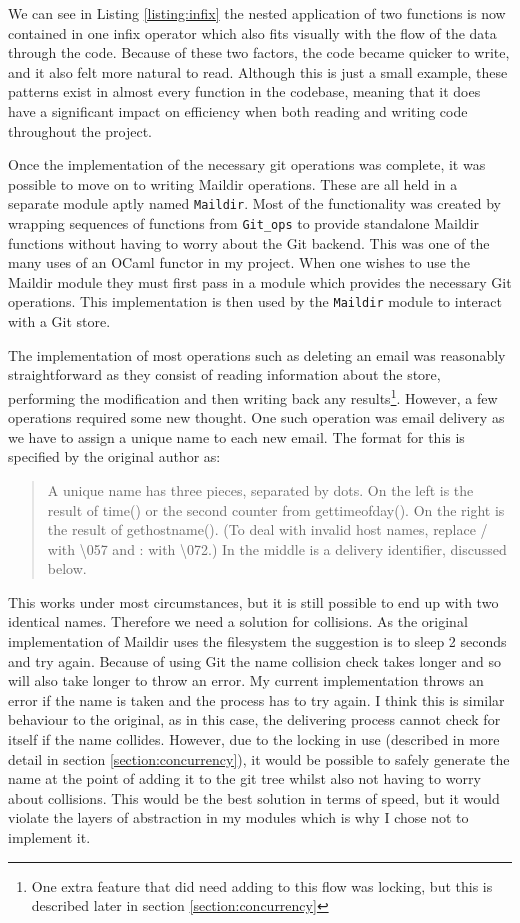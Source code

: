 We can see in Listing \ref{listing:infix} the nested application of two functions is now contained in one infix operator which also fits visually with the flow of the data through the code. Because of these two factors, the code became quicker to write, and it also felt more natural to read. Although this is just a small example, these patterns exist in almost every function in the codebase, meaning that it does have a significant impact on efficiency when both reading and writing code throughout the project.

Once the implementation of the necessary git operations was complete, it was possible to move on to writing Maildir operations. These are all held in a separate module aptly named \texttt{Maildir}. Most of the functionality was created by wrapping sequences of functions from \texttt{Git\_ops} to provide standalone Maildir functions without having to worry about the Git backend. This was one of the many uses of an OCaml functor in my project. When one wishes to use the Maildir module they must first pass in a module which provides the necessary Git operations. This implementation is then used by the \texttt{Maildir} module to interact with a Git store.

The implementation of most operations such as deleting an email was reasonably straightforward as they consist of reading information about the store, performing the modification and then writing back any results\footnote{One extra feature that did need adding to this flow was locking, but this is described later in section \ref{section:concurrency}}. However, a few operations required some new thought. One such operation was email delivery as we have to assign a unique name to each new email. The format for this is specified by the original author\cite{bernstein2000maildir} as:
\begin{quote}
  A unique name has three pieces, separated by dots. On the left is the result of time() or the second counter from gettimeofday(). On the right is the result of gethostname(). (To deal with invalid host names, replace / with \textbackslash057 and : with \textbackslash072.) In the middle is a delivery identifier, discussed below.
\end{quote}
This works under most circumstances, but it is still possible to end up with two identical names. Therefore we need a solution for collisions. As the original implementation of Maildir uses the filesystem the suggestion is to sleep 2 seconds and try again. Because of using Git the name collision check takes longer and so will also take longer to throw an error. My current implementation throws an error if the name is taken and the process has to try again. I think this is similar behaviour to the original, as in this case, the delivering process cannot check for itself if the name collides. However, due to the locking in use (described in more detail in section \ref{section:concurrency}), it would be possible to safely generate the name at the point of adding it to the git tree whilst also not having to worry about collisions. This would be the best solution in terms of speed, but it would violate the layers of abstraction in my modules which is why I chose not to implement it.

